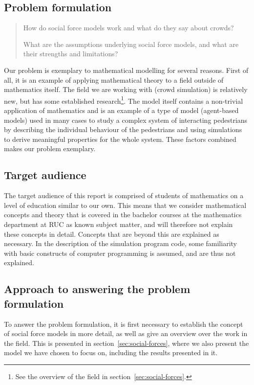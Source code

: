 \subsection{Problem formulation}
\begin{quote}
    How do social force models work and what do they say about crowds?

    What are the assumptions underlying social force models, and what are 
    their strengths and limitations?
\end{quote}

Our problem is exemplary to mathematical modelling for several reasons. First 
of all, it is an example of applying mathematical theory to a field outside of 
mathematics itself. The field we are working with (crowd simulation) is 
relatively new, but has some established research\footnote{See the overview of 
the field in section~\ref{sec:social-forces}.}. The model itself contains a 
non-trivial application of mathematics and is an example of a type of model 
(agent-based models) used in many cases to study a complex system of 
interacting pedestrians by describing the individual behaviour of the pedestrians and 
using simulations to derive meaningful properties for the whole system. These 
factors combined makes our problem exemplary.

\subsection{Target audience}
The target audience of this report is comprised of students of mathematics on 
a level of education similar to our own. This means that we consider 
mathematical concepts and theory that is covered in the bachelor courses at 
the mathematics department at RUC as known subject matter, and will therefore 
not explain these concepts in detail. Concepts that are beyond this are 
explained as necessary. In the description of the simulation program code, 
some familiarity with basic constructs of computer programming is assumed, and 
are thus not explained.

\subsection{Approach to answering the problem formulation}
To answer the problem formulation, it is first necessary to establish the 
concept of social force models in more detail, as well as give an overview 
over the work in the field. This is presented in 
section~\ref{sec:social-forces}, where we also present the model we have chosen 
to focus on, including the results presented in it.

